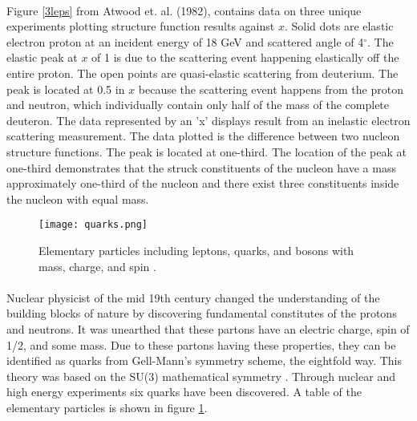 \paragraph{}Figure \ref{3leps} from Atwood et. al. (1982), contains data on three unique experiments plotting structure function results against $x$. Solid dots are elastic electron proton at an incident energy of 18 GeV and scattered angle of 4$^\circ$. The elastic peak at $x$ of 1 is due to the scattering event happening elastically off the entire proton. The open points are quasi-elastic scattering from deuterium. The peak is located at 0.5 in $x$ because the scattering event happens from the proton and neutron, which individually contain only half of the mass of the complete deuteron. The data represented by an 'x' displays result from an inelastic electron scattering measurement. The data plotted is the difference between two nucleon structure functions. The peak is located at one-third. The location of the peak at one-third demonstrates that the struck constituents of the nucleon have a mass approximately one-third of the nucleon and there exist three constituents inside the nucleon with equal mass\cite{Atwood,PnN}.
\begin{figure}[t]
	\centering
	\texttt{[image: quarks.png]} 
	\caption{ Elementary particles including leptons, quarks, and bosons with mass, charge, and spin \cite{sane}.}
	\label{fig:quarks}
\end{figure} 
\paragraph{}Nuclear physicist of the mid 19th century changed the understanding of the building blocks of nature by discovering fundamental constitutes of the protons and neutrons. It was unearthed that these partons have an electric charge, spin of 1/2, and some mass. Due to these partons having these properties, they can be identified as quarks from Gell-Mann's symmetry scheme, the eightfold way. This theory was based on the SU(3) mathematical symmetry \cite{strger,8fold}.
Through nuclear and high energy experiments six quarks have been discovered\cite{DISLaH}. A table of the elementary particles is shown in figure \ref{fig:quarks}.
